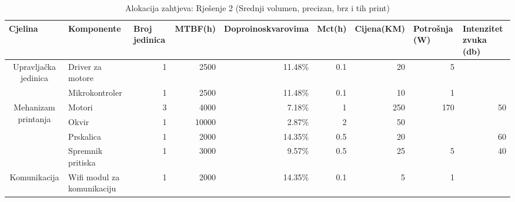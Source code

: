 \documentclass[12pt]{article}
\begin{document}
\begin{landscape}
\begin{table}[htbp]
    \scriptsize
  \centering
  \caption{Alokacija zahtjeva: Rješenje 2 (Srednji volumen, precizan, brz i tih print)}
    \begin{tabular}{ccccccccc}

    \toprule
    \multicolumn{1}{l}{Cjelina} & \multicolumn{1}{l}{Komponente} & \multicolumn{1}{l}{Broj jedinica} & \multicolumn{1}{l}{MTBF(h)} & \multicolumn{1}{p{5.215em}}{Doproinos\newline{}kvarovima} & \multicolumn{1}{l}{Mct(h)} & \multicolumn{1}{l}{Cijena(KM)} & \multicolumn{1}{l}{Potrošnja (W)} & \multicolumn{1}{l}{Intenzitet zvuka (db)} \\
    \midrule
    \multirow{2}[4]{*}{Upravljačka jedinica} & \multicolumn{1}{l}{Driver za motore} & \multicolumn{1}{r}{1} & \multicolumn{1}{r}{2500} & \multicolumn{1}{r}{11.48\%} & \multicolumn{1}{r}{0.1} & \multicolumn{1}{r}{20} & \multicolumn{1}{r}{5} &  \\
\cmidrule{5-5}          & \multicolumn{1}{l}{Mikrokontroler} & \multicolumn{1}{r}{1} & \multicolumn{1}{r}{2500} & \multicolumn{1}{r}{11.48\%} & \multicolumn{1}{r}{0.1} & \multicolumn{1}{r}{10} & \multicolumn{1}{r}{1} &  \\
    \midrule
    \multirow{4}[8]{*}{Mehanizam printanja} & \multicolumn{1}{l}{Motori} & \multicolumn{1}{r}{3} & \multicolumn{1}{r}{4000} & \multicolumn{1}{r}{7.18\%} & \multicolumn{1}{r}{1} & \multicolumn{1}{r}{250} & \multicolumn{1}{r}{170} & \multicolumn{1}{r}{50} \\
\cmidrule{5-5}          & \multicolumn{1}{l}{Okvir} & \multicolumn{1}{r}{1} & \multicolumn{1}{r}{10000} & \multicolumn{1}{r}{2.87\%} & \multicolumn{1}{r}{2} & \multicolumn{1}{r}{50} &       &  \\
\cmidrule{5-5}          & \multicolumn{1}{l}{Prskalica} & \multicolumn{1}{r}{1} & \multicolumn{1}{r}{2000} & \multicolumn{1}{r}{14.35\%} & \multicolumn{1}{r}{0.5} & \multicolumn{1}{r}{20} &       & \multicolumn{1}{r}{60} \\
\cmidrule{5-5}          & \multicolumn{1}{l}{Spremnik pritiska} & \multicolumn{1}{r}{1} & \multicolumn{1}{r}{3000} & \multicolumn{1}{r}{9.57\%} & \multicolumn{1}{r}{0.5} & \multicolumn{1}{r}{25} & \multicolumn{1}{r}{5} & \multicolumn{1}{r}{40} \\
    \midrule
    \multirow{2}[4]{*}{Komunikacija} & \multicolumn{1}{l}{Wifi modul za komunikaciju} & \multicolumn{1}{r}{1} & \multicolumn{1}{r}{2000} & \multicolumn{1}{r}{14.35\%} & \multicolumn{1}{r}{0.1} & \multicolumn{1}{r}{5} & \multicolumn{1}{r}{1} &  \\

\end{tabular}
\end{table}
\end{landscape}
\end{document}
